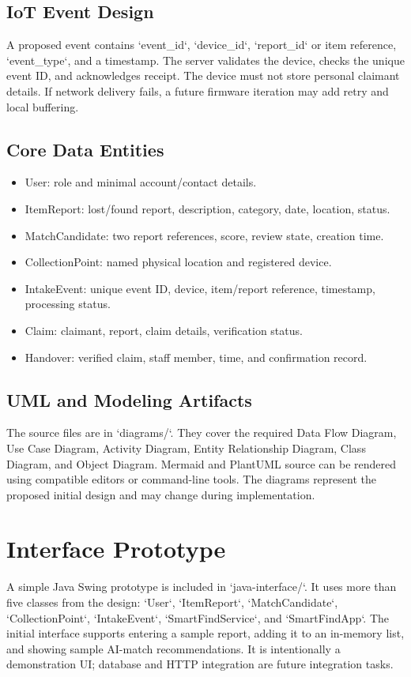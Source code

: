 \documentclass[12pt,a4paper]{report}
\begin{document}
\section{IoT Event Design}
A proposed event contains `event_id`, `device_id`, `report_id` or item reference, `event_type`, and a timestamp. The server validates the device, checks the unique event ID, and acknowledges receipt. The device must not store personal claimant details. If network delivery fails, a future firmware iteration may add retry and local buffering.

\section{Core Data Entities}
\begin{itemize}
\item User: role and minimal account/contact details.
\item ItemReport: lost/found report, description, category, date, location, status.
\item MatchCandidate: two report references, score, review state, creation time.
\item CollectionPoint: named physical location and registered device.
\item IntakeEvent: unique event ID, device, item/report reference, timestamp, processing status.
\item Claim: claimant, report, claim details, verification status.
\item Handover: verified claim, staff member, time, and confirmation record.
\end{itemize}

\section{UML and Modeling Artifacts}
The source files are in `diagrams/`. They cover the required Data Flow Diagram, Use Case Diagram, Activity Diagram, Entity Relationship Diagram, Class Diagram, and Object Diagram. Mermaid and PlantUML source can be rendered using compatible editors or command-line tools. The diagrams represent the proposed initial design and may change during implementation.

\chapter{Interface Prototype}
A simple Java Swing prototype is included in `java-interface/`. It uses more than five classes from the design: `User`, `ItemReport`, `MatchCandidate`, `CollectionPoint`, `IntakeEvent`, `SmartFindService`, and `SmartFindApp`. The initial interface supports entering a sample report, adding it to an in-memory list, and showing sample AI-match recommendations. It is intentionally a demonstration UI; database and HTTP integration are future integration tasks.
\end{document}
